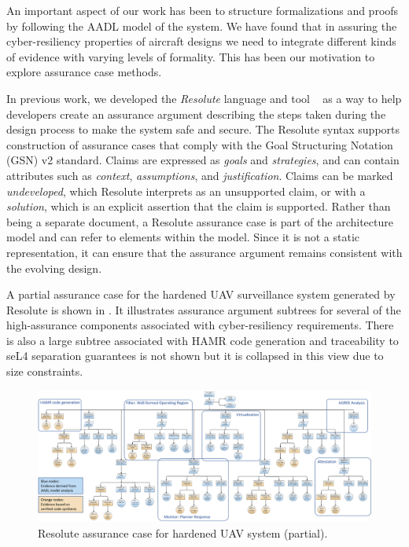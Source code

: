 An important aspect of our work has been to structure formalizations and proofs by following
the AADL model of the system. 
We have found that in assuring the cyber-resiliency properties of aircraft designs we need to integrate
different kinds of evidence with varying levels of formality. This has been our motivation to
explore assurance case methods.

In previous work, we developed the {\em Resolute} language and tool
~\cite{resolute-destion} as a way to help developers create an assurance
argument describing the steps taken during the design process to make the system safe and secure.
The Resolute syntax supports construction of assurance cases that comply with the Goal Structuring
Notation (GSN) v2 standard.
Claims are expressed as \textit{goals} and
\textit{strategies}, and can contain attributes such as \textit{context}, \textit{assumptions}, and
\textit{justification}. Claims can be marked \textit{undeveloped}, which Resolute interprets as an
unsupported claim, or with a \textit{solution}, which is an explicit assertion that the claim is
supported. Rather than being a separate document, a Resolute assurance case is part of the
architecture model and can refer to elements within the model. Since it is not a static
representation, it can ensure that the assurance argument remains consistent with the evolving
design.  

A partial assurance case for the hardened UAV surveillance system generated by Resolute 
is shown in .  It illustrates assurance argument subtrees for several of
the high-assurance components associated with cyber-resiliency requirements.  There is also a large subtree associated
with HAMR code generation and traceability to seL4 separation guarantees is not shown but it is collapsed in
this view due to size constraints.  

\begin{figure} 
\centering 
\includegraphics[width=\textwidth]{figs/assurance-case.png}
\caption{Resolute assurance case for hardened UAV system (partial).}
\label{fig:assurance-case} 
\end{figure}

